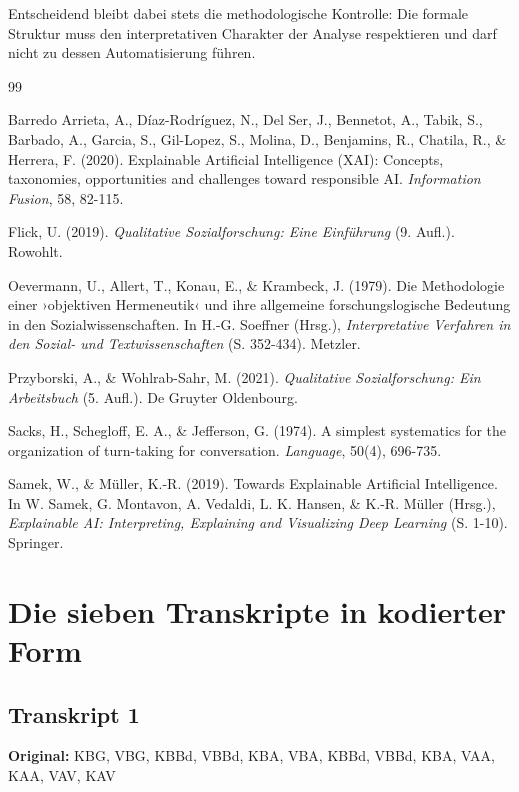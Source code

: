 \documentclass[
  12pt,
  a4paper,
  oneside,
  titlepage
]{article}
\begin{document}
Entscheidend bleibt dabei stets die methodologische Kontrolle: Die 
formale Struktur muss den interpretativen Charakter der Analyse 
respektieren und darf nicht zu dessen Automatisierung führen.

\newpage
\begin{thebibliography}{99}

Barredo Arrieta, A., Díaz-Rodríguez, N., Del Ser, J., Bennetot, A., Tabik, S., 
Barbado, A., Garcia, S., Gil-Lopez, S., Molina, D., Benjamins, R., Chatila, R., 
\& Herrera, F. (2020). Explainable Artificial Intelligence (XAI): Concepts, 
taxonomies, opportunities and challenges toward responsible AI. 
\textit{Information Fusion}, 58, 82-115.

Flick, U. (2019). \textit{Qualitative Sozialforschung: Eine Einführung} (9. Aufl.). 
Rowohlt.

Oevermann, U., Allert, T., Konau, E., \& Krambeck, J. (1979). Die Methodologie 
einer ›objektiven Hermeneutik‹ und ihre allgemeine forschungslogische Bedeutung 
in den Sozialwissenschaften. In H.-G. Soeffner (Hrsg.), \textit{Interpretative 
Verfahren in den Sozial- und Textwissenschaften} (S. 352-434). Metzler.

Przyborski, A., \& Wohlrab-Sahr, M. (2021). \textit{Qualitative Sozialforschung: 
Ein Arbeitsbuch} (5. Aufl.). De Gruyter Oldenbourg.

Sacks, H., Schegloff, E. A., \& Jefferson, G. (1974). A simplest systematics for 
the organization of turn-taking for conversation. \textit{Language}, 50(4), 696-735.

Samek, W., \& Müller, K.-R. (2019). Towards Explainable Artificial Intelligence. 
In W. Samek, G. Montavon, A. Vedaldi, L. K. Hansen, \& K.-R. Müller (Hrsg.), 
\textit{Explainable AI: Interpreting, Explaining and Visualizing Deep Learning} 
(S. 1-10). Springer.

\end{thebibliography}

\newpage
\appendix
\section{Die sieben Transkripte in kodierter Form}

\subsection{Transkript 1}
\textbf{Original:} KBG, VBG, KBBd, VBBd, KBA, VBA, KBBd, VBBd, KBA, VAA, KAA, VAV, KAV
\end{document}
